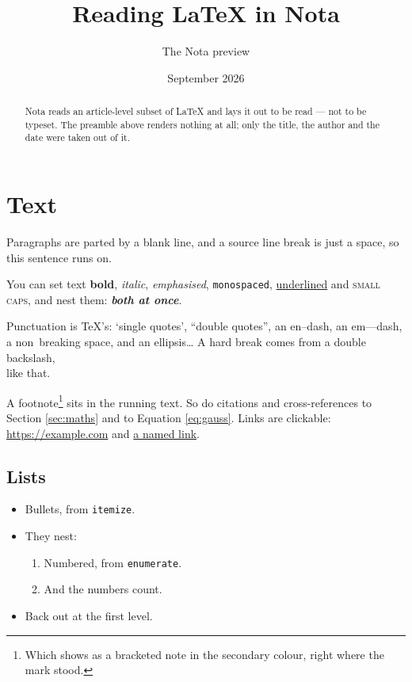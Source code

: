 \documentclass[11pt]{article}
\title{Reading \LaTeX{} in Nota}
\author{The Nota preview}
\date{September 2026}
\begin{document}
\maketitle

\begin{abstract}
Nota reads an article-level subset of \LaTeX{} and lays it out to be read ---
not to be typeset. The preamble above renders nothing at all; only the title,
the author and the date were taken out of it.
\end{abstract}

\section{Text}
\label{sec:text}

Paragraphs are parted by a blank line, and a source line break is just a space,
so this sentence
runs on.

You can set text \textbf{bold}, \textit{italic}, \emph{emphasised},
\texttt{monospaced}, \underline{underlined} and \textsc{small caps}, and nest
them: \textbf{\textit{both at once}}.

Punctuation is TeX's: `single quotes', ``double quotes'', an en--dash, an
em---dash, a non~breaking space, and an ellipsis\ldots{} A hard break comes
from a double backslash,\\ like that.

A footnote\footnote{Which shows as a bracketed note in the secondary colour,
right where the mark stood.} sits in the running text. So do citations
\cite{knuth1984} and cross-references to Section \ref{sec:maths} and to
Equation \eqref{eq:gauss}. Links are clickable: \url{https://example.com} and
\href{https://example.com}{a named link}.

\subsection{Lists}

\begin{itemize}
  \item Bullets, from \texttt{itemize}.
  \item They nest:
  \begin{enumerate}
    \item Numbered, from \texttt{enumerate}.
    \item And the numbers count.
  \end{enumerate}
  \item Back out at the first level.
\end{itemize}
\end{document}
